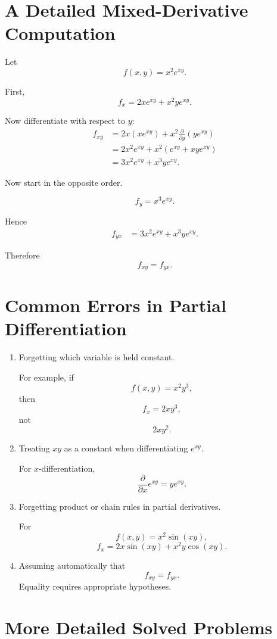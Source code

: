 \documentclass[11pt,oneside]{book}
\theoremstyle{studentthm}
\theoremstyle{definition}
\begin{document}
\section{A Detailed Mixed-Derivative Computation}

Let
\[
f(x,y)=x^2e^{xy}.
\]

First,
\[
f_x
=
2xe^{xy}+x^2ye^{xy}.
\]

Now differentiate with respect to \(y\):
\[
\begin{aligned}
f_{xy}
&=
2x(xe^{xy})
+
x^2\frac{\partial}{\partial y}
\left(ye^{xy}\right)\\
&=
2x^2e^{xy}
+
x^2\left(e^{xy}+xy e^{xy}\right)\\
&=
3x^2e^{xy}
+
x^3y e^{xy}.
\end{aligned}
\]

Now start in the opposite order.

\[
f_y
=
x^3e^{xy}.
\]

Hence
\[
\begin{aligned}
f_{yx}
&=
3x^2e^{xy}
+
x^3ye^{xy}.
\end{aligned}
\]

Therefore
\[
f_{xy}=f_{yx}.
\]

\section{Common Errors in Partial Differentiation}

\begin{enumerate}
\item Forgetting which variable is held constant.

For example, if
\[
f(x,y)=x^2y^3,
\]
then
\[
f_x=2xy^3,
\]
not
\[
2xy^2.
\]

\item Treating \(xy\) as a constant when differentiating
\(e^{xy}\).

For \(x\)-differentiation,
\[
\frac{\partial}{\partial x}e^{xy}
=
ye^{xy}.
\]

\item Forgetting product or chain rules in partial derivatives.

For
\[
f(x,y)=x^2\sin(xy),
\]
\[
f_x
=
2x\sin(xy)+x^2y\cos(xy).
\]

\item Assuming automatically that
\[
f_{xy}=f_{yx}.
\]
Equality requires appropriate hypotheses.
\end{enumerate}

\section{More Detailed Solved Problems}
\end{document}

